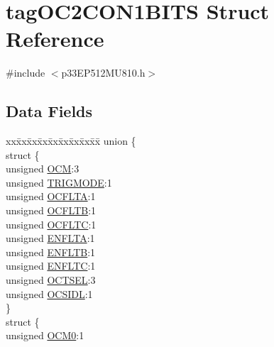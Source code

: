 \hypertarget{structtag_o_c2_c_o_n1_b_i_t_s}{}\section{tag\+O\+C2\+C\+O\+N1\+B\+I\+TS Struct Reference}
\label{structtag_o_c2_c_o_n1_b_i_t_s}


{\ttfamily \#include $<$p33\+E\+P512\+M\+U810.\+h$>$}

\subsection*{Data Fields}
\begin{DoxyCompactItemize}
\item 
\begin{tabbing}
xx\=xx\=xx\=xx\=xx\=xx\=xx\=xx\=xx\=\kill
union \{\\
\>struct \{\\
\>\>unsigned \hyperlink{structtag_o_c2_c_o_n1_b_i_t_s_a778fa0cf51a9477ac4e82d71a8733801}{OCM}:3\\
\>\>unsigned \hyperlink{structtag_o_c2_c_o_n1_b_i_t_s_a7a0057e0dca6e2663584b5b9e1da04c3}{TRIGMODE}:1\\
\>\>unsigned \hyperlink{structtag_o_c2_c_o_n1_b_i_t_s_acc967e41cecdeedc6ad4422f9ef1a6a3}{OCFLTA}:1\\
\>\>unsigned \hyperlink{structtag_o_c2_c_o_n1_b_i_t_s_a1fb30bb4421ef7c4bd0c66c379875593}{OCFLTB}:1\\
\>\>unsigned \hyperlink{structtag_o_c2_c_o_n1_b_i_t_s_a69a1772a4144abd579d17d28445b9934}{OCFLTC}:1\\
\>\>unsigned \hyperlink{structtag_o_c2_c_o_n1_b_i_t_s_a1e0f05fb23d516e003e4713fe8c1498a}{ENFLTA}:1\\
\>\>unsigned \hyperlink{structtag_o_c2_c_o_n1_b_i_t_s_a9d7aa97d5328b8b81ab7fd9145dfa0fc}{ENFLTB}:1\\
\>\>unsigned \hyperlink{structtag_o_c2_c_o_n1_b_i_t_s_a0b6f25c0f83f33b5501b6a2e6141a6ef}{ENFLTC}:1\\
\>\>unsigned \hyperlink{structtag_o_c2_c_o_n1_b_i_t_s_ae37d2a41dae2d2af1d82f7caae33cadb}{OCTSEL}:3\\
\>\>unsigned \hyperlink{structtag_o_c2_c_o_n1_b_i_t_s_afd05f4f249db4ef69b684e2f3fa6b703}{OCSIDL}:1\\
\>\} \\
\>struct \{\\
\>\>unsigned \hyperlink{structtag_o_c2_c_o_n1_b_i_t_s_a9271e84c9759ff10a7bc1cee3276e8f6}{OCM0}:1\\

\end{tabbing}
\end{DoxyCompactItemize}
